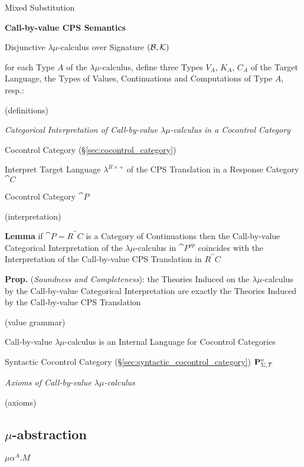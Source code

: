 Mixed Substitution


\textbf{Call-by-value CPS Semantics}

Disjunctive $\lambda\mu$-calculus over Signature
$(\mathcal{B},\mathcal{K})$

for each Type $A$ of the $\lambda\mu$-calculus, define three Types
$V_A$, $K_A$, $C_A$ of the Target Language, the Types of Values,
Continuations and Computations of Type $A$, resp.:

(definitions) %

\emph{Categorical Interpretation of Call-by-value $\lambda\mu$-calculus
  in a Cocontrol Category}

Cocontrol Category (\S\ref{sec:cocontrol_category})

Interpret Target Language $\lambda^{R\times+}$ of the CPS Translation
in a Response Category $\cat{C}$

Cocontrol Category $\cat{P}$

(interpretation) %

\textbf{Lemma} if $\cat{P} = R^\cat{C}$ is a Category of Continuations
then the Call-by-value Categorical Interpretation of the
$\lambda\mu$-calculus in $\cat{P}^{op}$ coincides with the
Interpretation of the Call-by-value CPS Translation in $R^\cat{C}$

\textbf{Prop.} (\emph{Soundness and Completeness}): the Theories
Induced on the $\lambda\mu$-calculus by the Call-by-value Categorical
Interpretation are exactly the Theories Induced by the Call-by-value
CPS Translation

(value grammar) %

Call-by-value $\lambda\mu$-calculus is an Internal Language for
Cocontrol Categories

Syntactic Cocontrol Category
(\S\ref{sec:syntactic_cocontrol_category})
$\mathbf{P}^v_{\Sigma,\mathcal{T}}$ %


\emph{Axioms of Call-by-value $\lambda\mu$-calculus}

(axioms) %




\subsection{$\mu$-abstraction}\label{sec:mu_abstraction}

$\mu\alpha^A.M$

